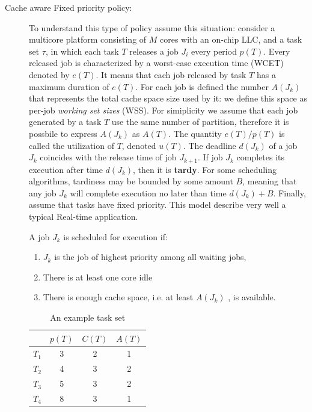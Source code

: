 \begin{description}
\item[Cache aware Fixed priority policy:] To understand this type of policy assume this situation: consider a multicore platform consisting of $M$ cores 
with an on-chip LLC, and a task set $\tau$, in which each task $T$ releases a job $J_i$ every period $p(T)$. Every released job is characterized by a 
worst-case execution time (WCET) denoted by $e(T)$. It means that each job released by task $T$ has a maximum duration of $e(T)$. For each job is defined 
the number $A(J_k)$ that represents the total cache space size used by it: we define this space as per-job \textit{working set sizes} (WSS). 
For simiplicity we assume that each job generated by a task $T$ use the same number of partition, therefore it is possbile to express $A(J_k)$ as $A(T)$. 
The quantity $e(T)/p(T)$ is called the utilization of $T$, denoted $u(T)$. The deadline $d(J_k)$ of a job $J_k$ coincides with the release time of job 
$J_{k+1}$. If job $J_k$ completes its execution after time $d(J_k)$, then it is \textbf{tardy}. For some scheduling algorithms, tardiness may be bounded 
by some amount $B$, meaning that any job $J_k$ will complete execution no later than time $d(J_k)+B$. Finally, assume that tasks have fixed priority.
This model describe very well a typical Real-time application.

A job $J_k$ is scheduled for execution if:

\begin{enumerate}
	\item $J_k$ is the job of highest priority among all waiting jobs,
	\item There is at least one core idle
	\item There is enough cache space, i.e. at least $A(J_k)$ , is available.
\end{enumerate}

\begin{table}[htbp]
\begin{center}
\begin{tabular}{l|c|c|c}
	\hline
	& $p(T)$ & $C(T)$ & $A(T)$ \\ \hline
	$T_1$ & 3 & 2 & 1 \\ \hline
	$T_2$ & 4 & 3 & 2 \\ \hline
	$T_3$ & 5 & 3 & 2 \\ \hline
	$T_4$ & 8 & 3 & 1 \\ 
	\hline
\end{tabular}
\caption{An example task set}
\label{tab:cache_task_set}
\end{center}
\end{table}


\end{description}
